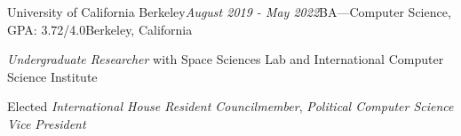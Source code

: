 \begin{rSubsection}{University of California Berkeley}{\em August 2019 - May 2022}{BA---Computer Science, GPA: 3.72/4.0}{Berkeley, California}
\item \textit{Undergraduate Researcher} with Space Sciences Lab and International Computer Science Institute
\item Elected \textit{International House Resident Councilmember}, \textit{Political Computer Science Vice President}
\end{rSubsection}
